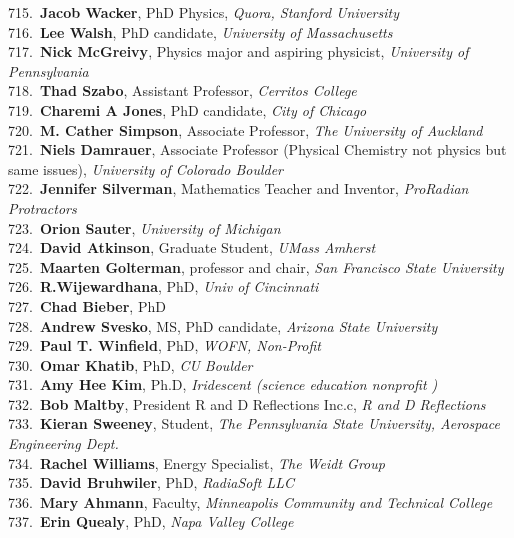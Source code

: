 715.~{\bf Jacob Wacker}, PhD Physics, {\sl Quora, Stanford University} \\
716.~{\bf Lee Walsh}, PhD candidate, {\sl University of Massachusetts} \\
717.~{\bf Nick McGreivy}, Physics major and aspiring physicist, {\sl University of Pennsylvania} \\
718.~{\bf Thad Szabo}, Assistant Professor, {\sl Cerritos College} \\
719.~{\bf Charemi A Jones}, PhD candidate, {\sl City of Chicago} \\
720.~{\bf M. Cather Simpson}, Associate Professor, {\sl The University of Auckland} \\
721.~{\bf Niels Damrauer}, Associate Professor (Physical Chemistry not physics but same issues), {\sl University of Colorado Boulder} \\
722.~{\bf Jennifer Silverman}, Mathematics Teacher and Inventor, {\sl ProRadian Protractors} \\
723.~{\bf Orion Sauter}, {\sl University of Michigan} \\
724.~{\bf David Atkinson}, Graduate Student, {\sl UMass Amherst} \\
725.~{\bf Maarten Golterman}, professor and chair, {\sl San Francisco State University} \\
726.~{\bf R.Wijewardhana}, PhD, {\sl Univ of Cincinnati} \\
727.~{\bf Chad Bieber}, PhD \\
728.~{\bf Andrew Svesko}, MS, PhD candidate, {\sl Arizona State University} \\
729.~{\bf Paul T. Winfield}, PhD, {\sl WOFN, Non-Profit} \\
730.~{\bf Omar Khatib}, PhD, {\sl CU Boulder} \\
731.~{\bf Amy Hee Kim}, Ph.D, {\sl Iridescent (science education nonprofit )} \\
732.~{\bf Bob Maltby}, President R and D Reflections Inc.c, {\sl R and D Reflections} \\
733.~{\bf Kieran Sweeney}, Student, {\sl The Pennsylvania State University, Aerospace Engineering Dept.} \\
734.~{\bf Rachel Williams}, Energy Specialist, {\sl The Weidt Group} \\
735.~{\bf David Bruhwiler}, PhD, {\sl RadiaSoft LLC} \\
736.~{\bf Mary Ahmann}, Faculty, {\sl Minneapolis Community and Technical College} \\
737.~{\bf Erin Quealy}, PhD, {\sl Napa Valley College} \\
